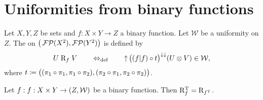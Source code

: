 \section{Uniformities from binary functions}
\begin{definition}
Let $X,Y,Z$ be sets and $f: X\times Y\to Z$ a binary function. Let $\mathcal{W}$ be a uniformity on $Z$. The  on $\big(\operatorname{\mathcal{FP}}(X^2),\operatorname{\mathcal{FP}}(Y^2)\big)$ is defined by
\[ U\mathrel{\mathrm{R}_{f}} V \quad\quad\Leftrightarrow_{\text{def}}\quad\quad \operatorname{\uparrow}\big((f|f)\circ t \big)^{\downarrow\downarrow}(U\otimes V) \in \mathcal{W}, \]
where $t \coloneqq \big((\pi_1\circ \pi_1, \pi_1\circ \pi_2),(\pi_2\circ \pi_1, \pi_2\circ \pi_2)\big)$.
\end{definition}

\begin{lemma} \label{transposeFunctionalUniformRelation}
Let $f: f: X\times Y\to \left( Z, \mathcal{W} \right)$ be a binary function. Then $\mathrm{R}_{f}^{\mathrm{T}} = \mathrm{R}_{f^{\mathrm{T}}}$.
\end{lemma}

